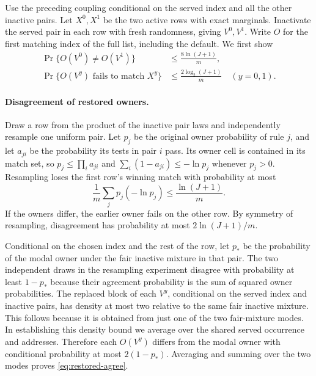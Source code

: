 \documentclass[11pt]{article}
\begin{document}
Use the preceding coupling conditional on the served index and all the
other inactive pairs. Let $X^0,X^1$ be the two active rows with exact
marginals. Inactivate the served pair in each row with fresh randomness,
giving $V^0,V^1$. Write $O$ for the first matching index of the full
list, including the default. We first show
\begin{align}
 \Pr\{O(V^0)\ne O(V^1)\}
   &\le \frac{8\ln(J+1)}{m}, \label{eq:restored-agree}\\
 \Pr\{O(V^y)\text{ fails to match }X^y\}
   &\le \frac{2\log_2(J+1)}{m}\quad (y=0,1).
     \label{eq:restored-survive}
\end{align}

\paragraph{Disagreement of restored owners.}
Draw a row from the product of the inactive pair laws and independently
resample one uniform pair. Let $p_j$ be the original owner probability
of rule $j$, and let $a_{ji}$ be the probability its tests in pair $i$
pass. Its owner cell is contained in its match set, so
$p_j\le\prod_i a_{ji}$ and $\sum_i(1-a_{ji})\le-\ln p_j$ whenever
$p_j>0$. Resampling loses the first row's winning match with
probability at most
\[
  \frac{1}{m}\sum_j p_j(-\ln p_j)\le\frac{\ln(J+1)}{m}.
\]
If the owners differ, the earlier owner fails on the other row.
By symmetry of resampling, disagreement has probability at most
$2\ln(J+1)/m$.

Conditional on the chosen index and the rest of the row, let $p_*$ be
the probability of the modal owner under the fair inactive mixture
in that pair. The two independent draws in the resampling experiment
disagree with probability at least $1-p_*$ because their agreement
probability is the sum of squared owner probabilities. The replaced
block of each $V^y$, conditional on the served index and inactive
pairs, has density at most two relative to the same fair inactive
mixture. This follows because it is obtained from just one of the
two fair-mixture modes. In establishing this density bound we
average over the shared served occurrence and addresses.
Therefore each $O(V^y)$ differs from the modal owner with conditional
probability at most $2(1-p_*)$. Averaging and summing over the two
modes proves \eqref{eq:restored-agree}.
\end{document}
